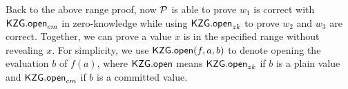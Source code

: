 Back to the above range proof, now $\mathcal{P}$ is able to prove $w_1$ is correct with $\mathsf{KZG.open}_{cm}$ in zero-knowledge while using $\mathsf{KZG.open}_{zk}$ to prove $w_2$ and $w_3$ are correct. Together, we can prove a value $x$ is in the specified range without revealing $x$. For simplicity, we use $\mathsf{KZG.open}(f,a,b)$ to denote opening the evaluation $b$ of $f(a)$, where $\mathsf{KZG.open}$ means $\mathsf{KZG.open}_{zk}$ if $b$ is a plain value and $\mathsf{KZG.open}_{cm}$ if $b$ is a committed value.
